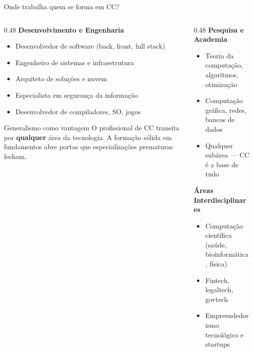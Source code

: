 \documentclass[aspectratio=169]{beamer}
\newcommand{\impt}[1]{\textcolor{morange}{\textbf{#1}}}
\newcommand{\cc}[1]{\textcolor{mcc}{\textbf{#1}}}
\begin{document}
\begin{frame}{Onde trabalha quem se forma em CC?}
  \vspace{-0.2cm}
  \begin{columns}[T]
    \begin{column}{0.48\textwidth}
      \cc{Desenvolvimento e Engenharia}
      \begin{itemize}\setlength\itemsep{3pt}
        \item Desenvolvedor de software (back, front, full stack)
        \item Engenheiro de sistemas e infraestrutura
        \item Arquiteto de soluções e nuvem
        \item Especialista em segurança da informação
        \item Desenvolvedor de compiladores, SO, jogos
      \end{itemize}
      \vspace{-0.2cm}
       \pause
       \footnotesize
      \begin{alertblock}{\footnotesize Generalismo como vantagem}
        O profissional de CC transita por \impt{qualquer} área da tecnologia. A formação sólida em fundamentos abre portas que especializações prematuras fecham.
      \end{alertblock}
    \end{column}
    \begin{column}{0.48\textwidth}
      \pause
       \cc{Pesquisa e Academia}
      \begin{itemize}\setlength\itemsep{3pt}
        \item Teoria da computação, algoritmos, otimização
        \item Computação gráfica, redes, bancos de dados
        \item Qualquer subárea --- CC é a base de tudo
      \end{itemize}
      \pause
      \cc{Áreas Interdisciplinares}
      \begin{itemize}\setlength\itemsep{3pt}
        \item Computação científica (saúde, bioinformática, física)
        \item Fintech, legaltech, govtech
        \item Empreendedorismo tecnológico e startups
      \end{itemize}
    
    \end{column}
  \end{columns}
\end{frame}
\end{document}
